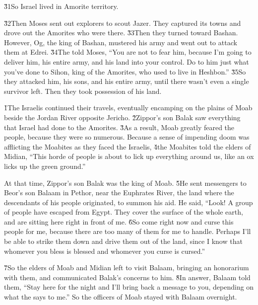 \v{31}So Israel lived in Amorite territory.

\v{32}Then Moses sent out explorers to scout Jazer. They captured its towns and drove out the Amorites who were there. \v{33}Then they turned toward Bashan. However, Og, the king of Bashan, mustered his army and went out to attack them at Edrei. \v{34}The  told Moses, ``You are not to fear him, because I'm going to deliver him, his entire army, and his land into your control. Do to him just what you've done to Sihon, king of the Amorites, who used to live in Heshbon.'' \v{35}So they attacked him, his sons, and his entire army, until there wasn't even a single survivor left. Then they took possession of his land.

\v{1}The Israelis continued their travels, eventually encamping on the plains of Moab beside the Jordan River opposite Jericho. \v{2}Zippor's son Balak saw everything that Israel had done to the Amorites. \v{3}As a result, Moab greatly feared the people, because they were so numerous. Because a sense of impending doom was afflicting the Moabites as they faced the Israelis, \v{4}the Moabites told the elders of Midian, ``This horde of people is about to lick up everything around us, like an ox licks up the green ground.''

At that time, Zippor's son Balak was the king of Moab. \v{5}He sent messengers to Beor's son Balaam in Pethor, near the Euphrates River, the land where the descendants of his people originated, to summon his aid. He said, ``Look! A group of people have escaped from Egypt. They cover the surface of the whole earth, and are sitting here right in front of me. \v{6}So come right now and curse this people for me, because there are too many of them for me to handle. Perhaps I'll be able to strike them down and drive them out of the land, since I know that whomever you bless is blessed and whomever you curse is cursed.''

\v{7}So the elders of Moab and Midian left to visit Balaam, bringing an honorarium with them, and communicated Balak's concerns to him. \v{8}In answer, Balaam told them, ``Stay here for the night and I'll bring back a message to you, depending on what the  says to me.'' So the officers of Moab stayed with Balaam overnight.

